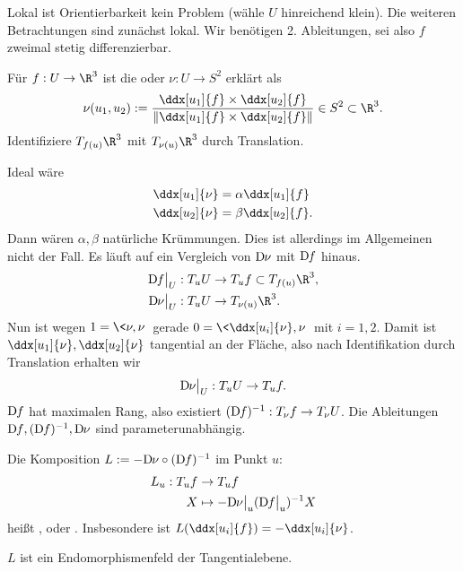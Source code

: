 Lokal ist Orientierbarkeit kein Problem (wähle $U$ hinreichend klein).
Die weiteren Betrachtungen sind zunächst lokal.
Wir benötigen 2. Ableitungen, sei also $f$ zweimal stetig differenzierbar.

\begin{df}
	Für $f: U \to \R^3$ ist die  oder  $\nu: U \to S^2$ erklärt als
	\[
		\nu(u_1, u_2) := \dfrac{\ddx[u_1]{f} \times \ddx[u_2]{f}}{\|\ddx[u_1]{f} \times \ddx[u_2]{f}\|} \in S^2 \subset \R^3.
	\]
	Identifiziere $T_{f(u)} \R^3$ mit $T_{\nu(u)}\R^3$ durch Translation.
\end{df}

Ideal wäre
\begin{align*}
	\ddx[u_1]{\nu} &= \alpha \ddx[u_1]{f} \\
	\ddx[u_2]{\nu} &= \beta \ddx[u_2]{f}.
\end{align*}
Dann wären $\alpha, \beta$ natürliche Krümmungen.
Dies ist allerdings im Allgemeinen nicht der Fall.
Es läuft auf ein Vergleich von $\Df[\nu]$ mit $\Df$ hinaus.
\begin{align*}
	\Df\big|_U : T_u U  &\bijto T_u f \subset T_{f(u)} \R^3, \\
	\Df[\nu]\big|_U : T_u U &\to T_{\nu(u)} \R^3.
\end{align*}
Nun ist wegen $1 = \<\nu, \nu\>$ gerade $0 = \<\ddx[u_i]{\nu}, \nu\>$ mit $i = 1,2$.
Damit ist $\ddx[u_1]{\nu}, \ddx[u_2]{\nu}$ tangential an der Fläche, also nach Identifikation durch Translation erhalten wir
\[
	\Df[\nu]\big|_U : T_u U \to T_u f.
\]
$\Df$ hat maximalen Rang, also existiert $(\Df)^{-1}: T_\nu f \to T_\nu U$.
Die Ableitungen $\Df, (\Df)^{-1}, \Df[\nu]$ sind parameterunabhängig.

\begin{df}[Weingartenabbildung]
	Die Komposition $L := -\Df[\nu] \circ (\Df)^{-1}$ im Punkt $u$:
	\begin{align*}
		L_u : T_u f &\to T_u f \\
		X &\mapsto -\Df[\nu]\big|_u (\Df\big|_u)^{-1} X
	\end{align*}
	heißt , oder .
	Insbesondere ist $L(\ddx[u_i]{f}) = - \ddx[u_i]{\nu}$.
\end{df}

$L$ ist ein Endomorphismenfeld der Tangentialebene.

